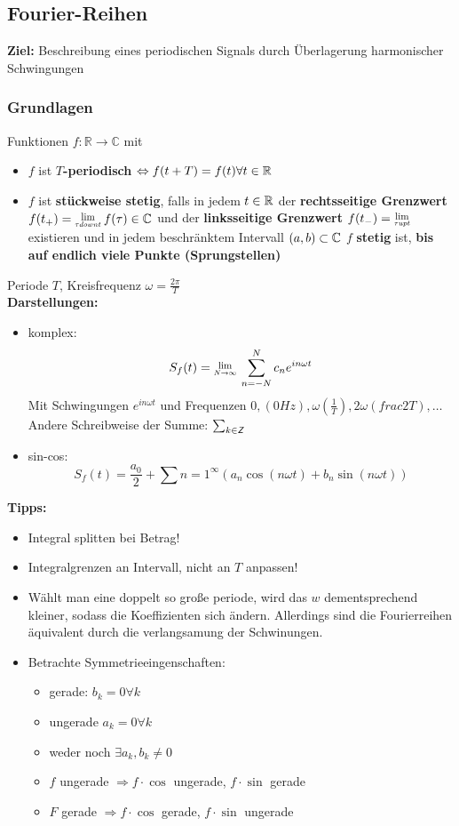 \documentclass[nocolor,german]{latex4ei/latex4ei_sheet}
\newcommand{\Lim}[1]{\raisebox{0.5ex}{\scalebox{0.8}{$\displaystyle \lim_{#1    }\;$}}}
\begin{document}
\subsection{Fourier-Reihen}
\textbf{Ziel:} Beschreibung eines periodischen Signals durch \"Uberlagerung harmonischer Schwingungen\\
\subsubsection{Grundlagen}
Funktionen $f: \mathbb{R} \to \mathbb{C}$ mit
\begin{itemize}
        \item $f$ ist \textbf{$T$-periodisch} $\Leftrightarrow f(t+T)=f(t) \forall t \in \operatorname{\mathbb R}$
        \item $f$ ist \textbf{st\"uckweise stetig}, falls in jedem $t \in \operatorname{\mathbb R}$ der \textbf{rechtsseitige Grenzwert} $f(t_+)=\Lim{\tau down t} f(\tau) \in \C$ und der \textbf{linksseitige Grenzwert} $f(t_-)=\Lim{\tau up t}$ existieren und in jedem beschr\"anktem Intervall $(a,b) \subset \mathbb C$ $f$ \textbf{stetig} ist, \textbf{bis auf endlich viele Punkte (Sprungstellen)}  
\end{itemize}
Periode $T$, Kreisfrequenz $\omega=\frac{2 \pi}{T}$\\
\textbf{Darstellungen:}\\
\begin{itemize}
        \item komplex:
                \[S_f(t)=\Lim{N \to \infty} \sum_{n=-N}^N c_n e^{i n \omega t}\]
				Mit Schwingungen $e^{i n \omega t}$ und Frequenzen $0, (0 Hz),\omega (\frac{1}{T}),2 \omega (frac{2}{T}),\ldots$\\
				Andere Schreibweise der Summe: $\sum_{k \in \operatorname{\textsf{\textit{Z}}}}$
        \item sin-cos:
                \[S_f(t)=\frac{a_0}{2}+\sum{n=1}^{\infty}(a_n \cos (n \omega t)+ b_n \sin (n \omega t))\]
\end{itemize}
\textbf{Tipps:}\\
\begin{itemize}
	\item Integral splitten bei Betrag!
	\item Integralgrenzen an Intervall, nicht an $T$ anpassen!
	\item W\"ahlt man eine doppelt so gro\ss{}e periode, wird das $w$ dementsprechend kleiner, sodass die Koeffizienten sich \"andern. Allerdings sind die Fourierreihen \"aquivalent durch die verlangsamung der Schwinungen.
	\item Betrachte Symmetrieeingenschaften:
		\begin{itemize}
			\item gerade: $b_k=0 \forall k$
			\item ungerade $a_k=0 \forall k$
			\item weder noch $\exists a_k,b_k \neq 0$
			\item $f$ ungerade $\Rightarrow f \cdot \cos$ ungerade, $f \cdot \sin$ gerade
			\item $F$ gerade $\Rightarrow f \cdot \cos$ gerade, $f \cdot \sin$ ungerade
		\end{itemize}
\end{itemize}
\end{document}
